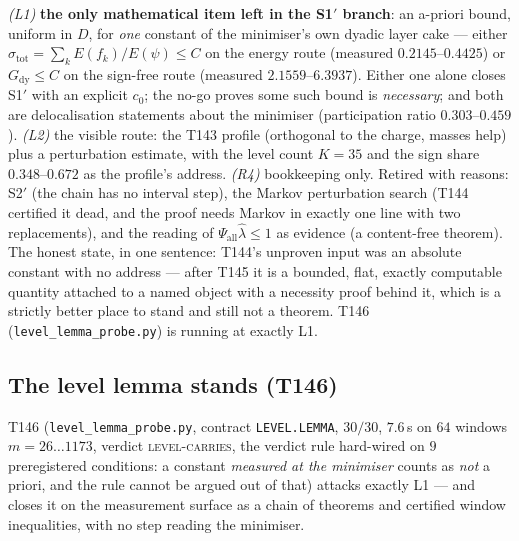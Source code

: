 \documentclass[11pt,a4paper]{article}
\begin{document}
\begin{keybox}
\emph{(L1)} \textbf{the only mathematical item left in the S1$'$ branch}: an a-priori bound,
uniform in $D$, for \emph{one} constant of the minimiser's own dyadic layer cake --- either
$\sigma_{\mathrm{tot}}=\sum_kE(f_k)/E(\psi)\le C$ on the energy route (measured
$0.2145$--$0.4425$) or $G_{\mathrm{dy}}\le C$ on the sign-free route (measured
$2.1559$--$6.3937$). Either one alone closes S1$'$ with an explicit $c_0$; the no-go proves
some such bound is \emph{necessary}; and both are delocalisation statements about the
minimiser (participation ratio $0.303$--$0.459$). \emph{(L2)} the visible route: the T143
profile (orthogonal to the charge, masses help) plus a perturbation estimate, with the level
count $K=35$ and the sign share $0.348$--$0.672$ as the profile's address. \emph{(R4)}
bookkeeping only. Retired with reasons: S2$'$ (the chain has no interval step), the Markov
perturbation search (T144 certified it dead, and the proof needs Markov in exactly one line
with two replacements), and the reading of $\Psi_{\mathrm{all}}\hat\lambda\le1$ as evidence (a
content-free theorem). The honest state, in one sentence: T144's unproven input was an absolute
constant with no address --- after T145 it is a bounded, flat, exactly computable quantity
attached to a named object with a necessity proof behind it, which is a strictly better place
to stand and still not a theorem. T146 (\texttt{level\_lemma\_probe.py}) is running at exactly
L1.
\end{keybox}

\subsection{The level lemma stands (T146)}
T146 (\texttt{level\_lemma\_probe.py}, contract \texttt{LEVEL.LEMMA}, $30/30$, $7.6$\,s on $64$
windows $m=26\ldots1173$, verdict \textsc{level-carries}, the verdict rule hard-wired on $9$
preregistered conditions: a constant \emph{measured at the minimiser} counts as \emph{not} a
priori, and the rule cannot be argued out of that) attacks exactly L1 --- and closes it on the
measurement surface as a chain of theorems and certified window inequalities, with no step
reading the minimiser.
\end{document}

